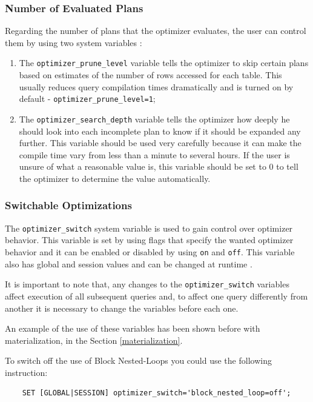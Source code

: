 \documentclass[12pt]{article}
\begin{document}
\subsubsection{Number of Evaluated Plans}
\label{numberEvalutedPlans}
Regarding the number of plans that the optimizer evaluates, the user can control them by using two system variables \parencite{ControllingQueryPlanEval}:
\begin{enumerate}
    \item The \verb|optimizer_prune_level| variable tells the optimizer to skip certain plans based on estimates of the number of rows accessed for each table. This usually reduces query compilation times dramatically and is turned on by default - \verb|optimizer_prune_level=1|;
    
    \item The \verb|optimizer_search_depth| variable tells the optimizer how deeply he should look into each incomplete plan to know if it should be expanded any further. This variable should be used very carefully because it can make the compile time vary from less than a minute to several hours. If the user is unsure of what a reasonable value is, this variable should be set to 0 to tell the optimizer to determine the value automatically.
\end{enumerate}


\subsubsection{Switchable Optimizations}
\label{switchableOptimizations}
The \verb|optimizer_switch| system variable is used to gain control over optimizer behavior. This variable is set by using flags that specify the wanted optimizer behavior and it can be enabled or disabled by using \verb|on| and \verb|off|. This variable also has global and session values and can be changed at runtime \parencite{SwitchableOptimizations}.

It is important to note that, any changes to the \verb|optimizer_switch| variables affect execution of all subsequent queries and, to affect one query differently from another it is necessary to change the variables before each one.

An example of the use of these variables has been shown before with materialization, in the Section \ref{materialization}.

\vspace{0.3cm}
\noindent To switch off the use of Block Nested-Loops you could use the following instruction:
\begin{verbatim}
    SET [GLOBAL|SESSION] optimizer_switch='block_nested_loop=off';
\end{verbatim}
\end{document}

